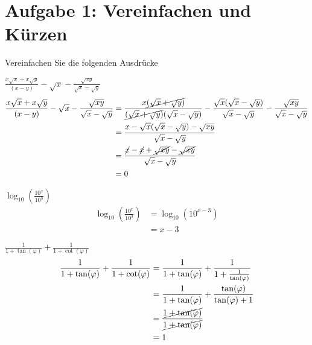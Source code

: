  


	\section*{Aufgabe 1: Vereinfachen und Kürzen}
	Vereinfachen Sie die folgenden Ausdrücke
	\begin{enumeralph}
		\item $\frac{x\sqrt{x}+x\sqrt{y}}{(x-y)} - \sqrt{x} - \frac{\sqrt{xy}}{\sqrt{x}-\sqrt{y}}$
		\begin{align*}
			\frac{x\sqrt{x}+x\sqrt{y}}{(x-y)} - \sqrt{x} - \frac{\sqrt{xy}}{\sqrt{x}-\sqrt{y}}&=\frac{x\cancel{(\sqrt{x} + \sqrt{y})}}{\cancel{(\sqrt{x}+\sqrt{y})}(\sqrt{x}-\sqrt{y})} - \frac{\sqrt{x}(\sqrt{x}-\sqrt{y})}{\sqrt{x}-\sqrt{y}} - \frac{\sqrt{xy}}{\sqrt{x}-\sqrt{y}}\\
			&=\frac{x-\sqrt{x}(\sqrt{x}-\sqrt{y})-\sqrt{xy}}{\sqrt{x}-\sqrt{y}}\\
			&=\frac{\cancel{x}-\cancel{x}+\cancel{\sqrt{xy}}-\cancel{\sqrt{xy}}}{\sqrt{x}-\sqrt{y}}\\
			&=0
		\end{align*}
		\item $\log_{10} (\frac{10^x}{10^3})$
		\begin{align*}
		\log_{10} (\frac{10^x}{10^3})&=\log_{10}(10^{x-3})\\
		&=x-3
		\end{align*}
		\item $\frac{1}{1+\tan(\varphi)}+\frac{1}{1+\cot(\varphi)}$
		\begin{align*}
		\frac{1}{1+\tan(\varphi)}+\frac{1}{1+\cot(\varphi)}&=\frac{1}{1+\tan(\varphi)}+\frac{1}{1+\frac{1}{\tan(\varphi)}}\\
		&=\frac{1}{1+\tan(\varphi)}+\frac{\tan(\varphi)}{\tan(\varphi)+1}\\
		&=\frac{\cancel{1+\tan(\varphi)}}{\cancel{1+\tan(\varphi)}}\\
		&=1
		\end{align*}
	\end{enumeralph}

